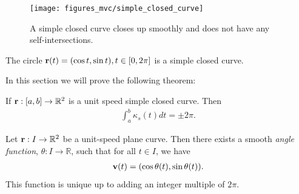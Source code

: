 \documentclass[12pt,letterpaper,reqno]{article}
\numberwithin{equation}{section}
\newcommand{\R}{\ensuremath{\mathbb R}}
\newcommand{\bv}{{\bf v}}
\newcommand{\bbr}{{\bf r}}
\newcommand{\fixme}[1]{{\color{orange}{[#1]}}}
\begin{document}
{\begin{figure}[h]
	\begin{center}
		\texttt{[image: figures\_mvc/simple\_closed\_curve]}
	\end{center}
	\caption{A simple closed curve closes up smoothly and does not have any self-intersections.}
\end{figure}

\begin{example}
The circle $\bbr(t)=(\cos t, \sin t), t \in [0,2\pi]$ is a simple closed curve.	
\end{example}

In this section we will prove the following theorem:

\begin{thm}
	If $\bbr:[a,b] \to \R^2$ is a unit speed simple closed curve. Then
	\begin{align*}
		\int_a^b\kappa_s(t)dt=\pm 2\pi.
	\end{align*}
	\fixme{Explain the sign.}
\end{thm}

\begin{prop}\label{prop:global_angle_function}
	Let $\bbr:I \to \R^2$ be a unit-speed plane curve. Then there exists a smooth \emph{angle function}, $\theta:I \to \R$, such that for all $t \in I$, we have
	\begin{align}\label{eq:angle_function_for_plane_curve}
		\bv(t)=(\cos\theta(t),\sin\theta(t)).
	\end{align}
	This function is unique up to adding an integer multiple of $2 \pi$.
\end{prop}

}
\end{document}
